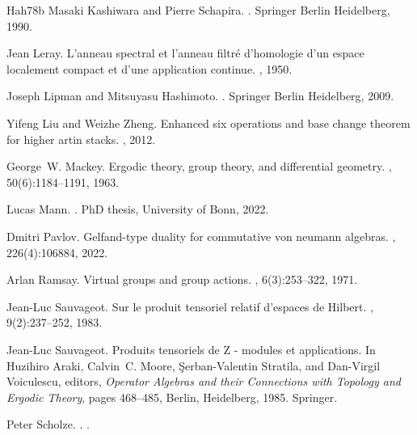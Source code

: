 \documentclass[10pt,a4paper,oneside]{amsart}
\theoremstyle{remark}
\theoremstyle{definition}
\begin{document}
\begin{thebibliography}{Hah78b}
	Masaki Kashiwara and Pierre Schapira.
	.
	\newblock Springer Berlin Heidelberg, 1990.
	
	Jean Leray.
	\newblock L'anneau spectral et l'anneau filtr{\'e} d'homologie d'un espace
	localement compact et d'une application continue.
	, 1950.
	
	Joseph Lipman and Mitsuyasu Hashimoto.
	.
	\newblock Springer Berlin Heidelberg, 2009.
	
	Yifeng Liu and Weizhe Zheng.
	\newblock Enhanced six operations and base change theorem for higher artin
	stacks.
	, 2012.
	
	George~W. Mackey.
	\newblock Ergodic theory, group theory, and differential geometry.
	, 50(6):1184--1191, 1963.
	
	Lucas Mann.
	.
	\newblock PhD thesis, University of Bonn, 2022.
	
	Dmitri Pavlov.
	\newblock Gelfand-type duality for commutative von neumann algebras.
	, 226(4):106884, 2022.
	
	Arlan Ramsay.
	\newblock Virtual groups and group actions.
	, 6(3):253--322, 1971.
	
	Jean-Luc Sauvageot.
	\newblock Sur le produit tensoriel relatif d'espaces de {H}ilbert.
	, 9(2):237--252, 1983.
	
	Jean-Luc Sauvageot.
	\newblock Produits tensoriels de {Z} - modules et applications.
	\newblock In Huzihiro Araki, Calvin~C. Moore, Şerban-Valentin Stratila, and
	Dan-Virgil Voiculescu, editors, {\em Operator {Algebras} and their
		{Connections} with {Topology} and {Ergodic} {Theory}}, pages 468--485,
	Berlin, Heidelberg, 1985. Springer.
	
	Peter Scholze.
	.
	.
	

\end{thebibliography}
\end{document}
